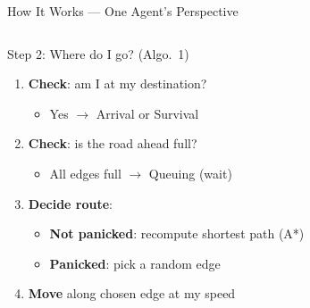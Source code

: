 \documentclass[aspectratio=169, xcolor=table]{beamer}
\newcommand{\source}[1]{\par\vspace{-0.15em}{\raggedleft\fontsize{5.4}{6.0}\selectfont\textcolor{gray}{#1}\par}}
\begin{document}
\begin{frame}[t,shrink=5]{How It Works --- One Agent's Perspective}
\begin{columns}[T,onlytextwidth]
\begin{block}{\small Step 2: Where do I go? \normalsize\textcolor{highlightblue}{(Algo.\ 1)}}
\scriptsize
\begin{enumerate}\itemsep0.3em
  \item \textbf{Check}: am I at my destination?
    \begin{itemize}\itemsep0.1em
      \item[$\circ$] Yes $\to$ \textcolor{statearrival}{Arrival} or \textcolor{statesurvival}{Survival}
    \end{itemize}
  \item \textbf{Check}: is the road ahead full?
    \begin{itemize}\itemsep0.1em
      \item[$\circ$] All edges full $\to$ \textcolor{statequeuing}{Queuing} (wait)
    \end{itemize}
  \item \textbf{Decide route}:
    \begin{itemize}\itemsep0.1em
      \item[$\circ$] \textbf{Not panicked}: recompute shortest path (A*)
      \item[$\circ$] \textbf{Panicked}: pick a random edge
    \end{itemize}
  \item \textbf{Move} along chosen edge at my speed
\end{enumerate}
\end{block}
\end{columns}

\vspace{0.3em}
\begin{center}
\end{center}
\source{Shi et al.\ (2024), Algorithms 1--2}
\end{frame}
\end{document}
